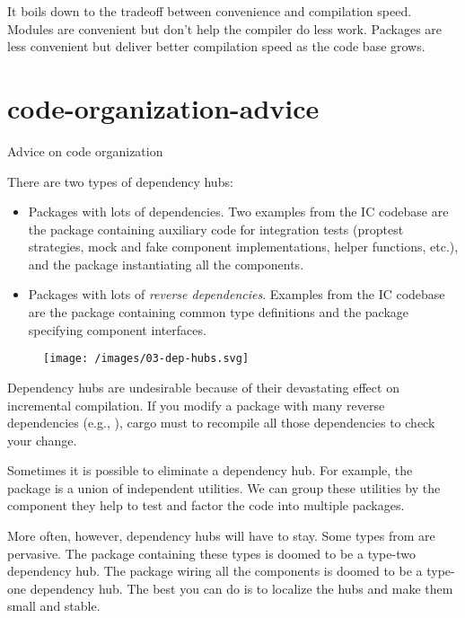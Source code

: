 \documentclass{article}
\begin{document}
It boils down to the tradeoff between convenience and compilation speed.
Modules are convenient but don't help the compiler do less work.
Packages are less convenient but deliver better compilation speed as the code base grows.

\section{code-organization-advice}{Advice on code organization}


There are two types of dependency hubs:
\begin{itemize}
\item
  Packages with lots of dependencies.
  Two examples from the IC codebase are the  package containing auxiliary code for integration tests
  (proptest strategies, mock and fake component implementations, helper functions, etc.),
  and the  package instantiating all the components.
\item
  Packages with lots of \emph{reverse dependencies}.
  Examples from the IC codebase are the  package containing common type definitions and the  package specifying component interfaces.
\end{itemize}

\begin{figure}[grayscale-diagram]
  \texttt{[image: /images/03-dep-hubs.svg]}
\end{figure}

Dependency hubs are undesirable because of their devastating effect on incremental compilation.
If you modify a package with many reverse dependencies (e.g., ), cargo must to recompile all those dependencies to check your change.

Sometimes it is possible to eliminate a dependency hub.
For example, the  package is a union of independent utilities.
We can group these utilities by the component they help to test and factor the code into multiple  packages.

More often, however, dependency hubs will have to stay.
Some types from  are pervasive.
The package containing these types is doomed to be a type-two dependency hub.
The  package wiring all the components is doomed to be a type-one dependency hub.
The best you can do is to localize the hubs and make them small and stable.
\end{document}
